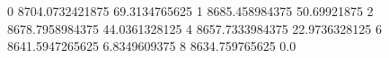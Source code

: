 0 8704.0732421875 69.3134765625
1 8685.458984375 50.69921875
2 8678.7958984375 44.0361328125
4 8657.7333984375 22.9736328125
6 8641.5947265625 6.8349609375
8 8634.759765625 0.0
